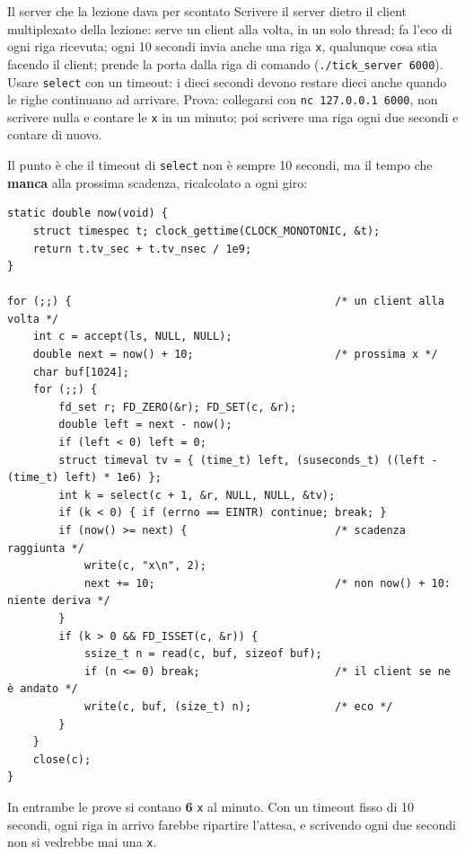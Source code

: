 \begin{esercizio}{Il server che la lezione dava per scontato}
Scrivere il server dietro il client multiplexato della lezione: serve un client alla volta, in un solo thread; fa l'eco di ogni riga
ricevuta; ogni 10 secondi invia anche una riga \texttt{x}, qualunque cosa stia facendo il client; prende la porta dalla riga di comando
(\texttt{./tick\_server 6000}). Usare \texttt{select} con un timeout: i dieci secondi devono restare dieci anche quando le righe continuano
ad arrivare. Prova: collegarsi con \texttt{nc 127.0.0.1 6000}, non scrivere nulla e contare le \texttt{x} in un minuto; poi scrivere una
riga ogni due secondi e contare di nuovo.

\svolgimento
Il punto è che il timeout di \texttt{select} non è sempre 10 secondi, ma il tempo che \textbf{manca} alla prossima scadenza, ricalcolato a
ogni giro:
\begin{lstlisting}[language={[POSIX]C}]
static double now(void) {
    struct timespec t; clock_gettime(CLOCK_MONOTONIC, &t);
    return t.tv_sec + t.tv_nsec / 1e9;
}

for (;;) {                                         /* un client alla volta */
    int c = accept(ls, NULL, NULL);
    double next = now() + 10;                      /* prossima x */
    char buf[1024];
    for (;;) {
        fd_set r; FD_ZERO(&r); FD_SET(c, &r);
        double left = next - now();
        if (left < 0) left = 0;
        struct timeval tv = { (time_t) left, (suseconds_t) ((left - (time_t) left) * 1e6) };
        int k = select(c + 1, &r, NULL, NULL, &tv);
        if (k < 0) { if (errno == EINTR) continue; break; }
        if (now() >= next) {                       /* scadenza raggiunta */
            write(c, "x\n", 2);
            next += 10;                            /* non now() + 10: niente deriva */
        }
        if (k > 0 && FD_ISSET(c, &r)) {
            ssize_t n = read(c, buf, sizeof buf);
            if (n <= 0) break;                     /* il client se ne è andato */
            write(c, buf, (size_t) n);             /* eco */
        }
    }
    close(c);
}
\end{lstlisting}
In entrambe le prove si contano \textbf{6} \texttt{x} al minuto. Con un timeout fisso di 10 secondi, ogni riga in arrivo farebbe ripartire
l'attesa, e scrivendo ogni due secondi non si vedrebbe mai una \texttt{x}.
\end{esercizio}


